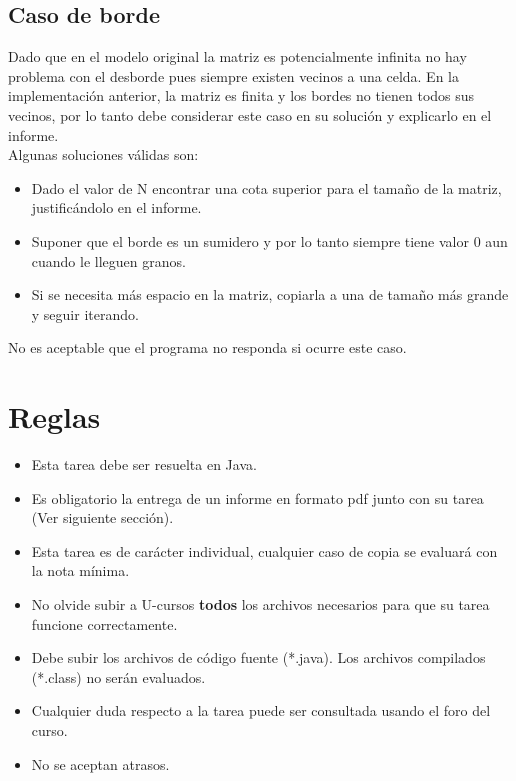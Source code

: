 \documentclass[dcc]{fcfmcourse}
\begin{document}
\subsection*{Caso de borde}

Dado que en el modelo original la matriz es potencialmente infinita no hay problema con el desborde pues siempre existen vecinos a una celda. En la implementación anterior, la matriz es finita y los bordes no tienen todos sus vecinos, por lo tanto debe considerar este caso en su solución y explicarlo en el informe. \\

Algunas soluciones válidas son: 

\begin{itemize}
    \item Dado el valor de N encontrar una cota superior para el tamaño de la matriz, justificándolo en el informe.
    \item Suponer que el borde es un sumidero y por lo tanto siempre tiene valor 0 aun cuando le lleguen granos.
    \item Si se necesita más espacio en la matriz, copiarla a una de tamaño más grande y seguir iterando.
\end{itemize}

No es aceptable que el programa no responda si ocurre este caso.  

\newpage
\section{Reglas}

\begin{itemize}
    \item Esta tarea debe ser resuelta en Java.
    \item Es obligatorio la entrega de un informe en formato pdf junto con su tarea (Ver siguiente sección).
    \item Esta tarea es de carácter individual, cualquier caso de copia se evaluará con la nota mínima.
    \item No olvide subir a U-cursos \textbf{todos} los archivos necesarios para que su tarea funcione correctamente.
    \item Debe subir los archivos de código fuente (*.java). Los archivos compilados (*.class) no serán evaluados.
    \item Cualquier duda respecto a la tarea puede ser consultada usando el foro del curso.
    \item No se aceptan atrasos.
\end{itemize}
\end{document}
